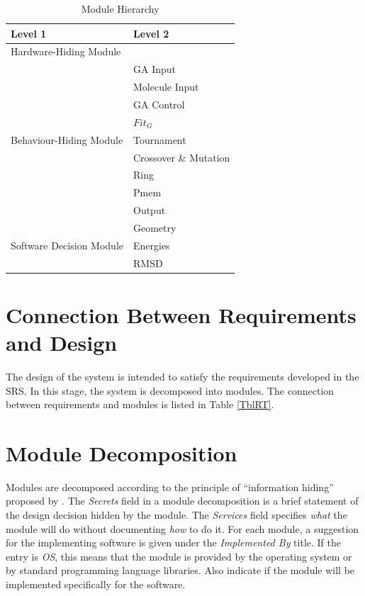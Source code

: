 \documentclass[12pt, titlepage]{article}
\begin{document}
\begin{table}[h!]
\centering
\begin{tabular}{p{} p{}}
\toprule
\textbf{Level 1} & \textbf{Level 2}\\
\midrule

{Hardware-Hiding Module} & ~ \\
\midrule

\multirow{9}{0.3\textwidth}{Behaviour-Hiding Module}& GA Input \\
													& Molecule Input \\
													& GA Control\\
													& $Fit_G$ \\
													& Tournament \\
													& Crossover \& Mutation \\
													& Ring \\
													& Pmem \\
													& Output \\

\midrule

\multirow{3}{0.3\textwidth}{Software Decision Module} & Geometry \\
													  & Energies \\
													  & RMSD \\
\bottomrule

\end{tabular}
\caption{Module Hierarchy}
\label{TblMH}
\end{table}

\section{Connection Between Requirements and Design} \label{SecConnection}

The design of the system is intended to satisfy the requirements developed in
the SRS. In this stage, the system is decomposed into modules. The connection
between requirements and modules is listed in Table \ref{TblRT}.

\section{Module Decomposition} \label{SecMD}

Modules are decomposed according to the principle of ``information hiding''
proposed by \citet{ParnasEtAl1984}. The \emph{Secrets} field in a module
decomposition is a brief statement of the design decision hidden by the
module. The \emph{Services} field specifies \emph{what} the module will do
without documenting \emph{how} to do it. For each module, a suggestion for the
implementing software is given under the \emph{Implemented By} title. If the
entry is \emph{OS}, this means that the module is provided by the operating
system or by standard programming language libraries.  Also indicate if the
module will be implemented specifically for the software.
\end{document}
